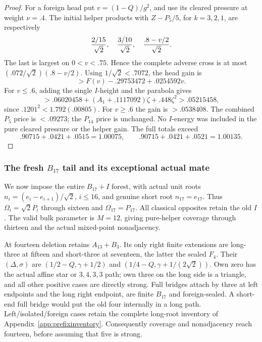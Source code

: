 \documentclass[11pt]{article}
\theoremstyle{definition}
\theoremstyle{remark}
\begin{document}
\begin{proof}
For a foreign head put \(v=(1-Q)/g^2\), and use its cleared
pressure at weight \(\nu=.4\). The initial helper products with
\(Z-P_5/5\), for \(k=3,2,1\), are respectively
\[
 {2/15\over\sqrt2},\quad {3/10\over\sqrt2},\quad
 {.8-v/2\over\sqrt2}.
\]
The last is largest on \(0<v<.75\). Hence the complete adverse
cross is at most \((.072/\sqrt2)(.8-v/2)\).
Using \(1/\sqrt2<.7072\), the head gain is
\[
 >F(v)-.29753472+.0254592v.
\]
For \(v\le.6\), adding the single \(I\)-height and the parabola gives
\[
 >.06020458+(A_1+.1117092)\zeta+.448\zeta^2
 >.05215458,
\]
since \(.1201^2<1.792(.00805)\).
For \(v\ge.6\) the gain is \(>.0538408\).
The combined \(P_5\) price is \(<.09273\); the \(P_{14}\) price
is unchanged. No \(I\)-energy was included in the pure cleared
pressure or the helper gain. The full totals exceed
\[
 .90715+.0421+.0515=1.00075,\qquad
 .90715+.0421+.0521=1.00135 .
\]
\end{proof}

\subsubsection{The fresh \(B_{17}\) tail and its exceptional actual mate}
We now impose the entire \(B_{17}+I\) forest, with actual unit roots
\(n_i=(e_i-e_{i+1})/\sqrt2\), \(i\le16\), and genuine short
root \(n_{17}=e_{17}\). Thus
\(\Omega_i=\sqrt2P_i\) through sixteen and \(\Omega_{17}=P_{17}\).
All classical opposites retain the old \(I\).
The valid bulk parameter is \(M=12\), giving pure-helper coverage
through thirteen and the actual mixed-point nonadjacency.

At fourteen deletion retains \(A_{13}+B_3\).
Its only right finite extensions are long-three at fifteen and
short-three at seventeen, the latter the sealed \(F_4\).
Their \((\Delta,\sigma)\) are
\((1/2-Q,\gamma+1/2)\) and
\((1/4-Q,\gamma+1/(2\sqrt2))\).
Own zero has the actual affine star or \(3,4,3,3\) path;
own three on the long side is a triangle, and all other positive
cases are directly strong. Full bridges attach by three at left
endpoints and the long right endpoint, are finite \(B_{17}\) and
foreign-sealed. A short-end full bridge would put the old four
internally in a long path. Left/isolated/foreign cases retain the
complete long-root inventory of Appendix~\ref{app:prefixinventory}.
Consequently coverage and nonadjacency reach fourteen, before
assuming that five is strong.
\end{document}
